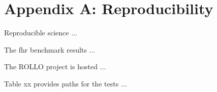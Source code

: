 \chapter*{Appendix A: Reproducibility} 

Reproducible science ... 

The fhr benchmark results ... 

The ROLLO project is hosted ... 

Table xx provides paths for the tests ... 